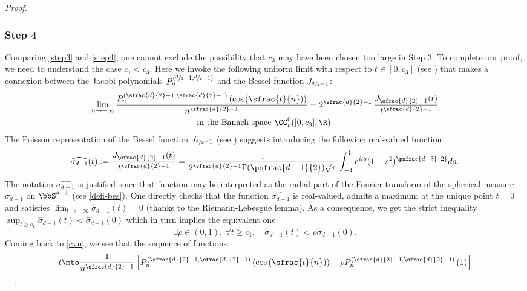 \begin{proof}
\subsubsection*{Step 4} Comparing \eqref{step3} and \eqref{step4}, one cannot exclude the possibility that $c_3$ may have been chosen too large in Step 3.
To complete our proof, we need to understand the case $c_1<c_3$.
Here we invoke the following uniform limit with respect to $t\in [0,c_3]$ (see \cite[p.\,192, (8.1.1)]{szeg}) that makes a connexion between the Jacobi polynomials $P_n^{(\sfrac{d}{2}-1,\sfrac{d}{2}-1)}$ and the Bessel function $J_{\sfrac{d}{2}-1}$:
\begin{multline}\label{cvu}
\lim_{n\to +\infty} \frac{P_n^{(\sfrac{d}{2}-1,\sfrac{d}{2}-1)}\left(\cos\left(\sfrac{t}{n}\right) \right)}{n^{\sfrac{d}{2}-1}}=2^{\sfrac{d}{2}-1}\, \frac{J_{\sfrac{d}{2}-1}(t)}{t^{\sfrac{d}{2}-1}}\\ \text{in the Banach space } \CC_t^0([0,c_3],\R).
\end{multline}
The Poisson representation of the Bessel function $J_{\sfrac{d}{2}-1}$ (see \cite[p.\,15, (1.71.6)]{szeg}) suggests introducing the following real-valued function
\begin{equation}\label{Poisson} \widehat{\sigma_{d-1}}(t):=\frac{J_{\sfrac{d}{2}-1}(t)}{t^{\sfrac{d}{2}-1}}=\frac{1}{2^{\sfrac{d}{2}-1}\Gamma(\psfrac{d-1}{2})\sqrt{\pi}}\int_{-1}^{1} e^{its} (1-s^2)^{\psfrac{d-3}{2}}ds.\end{equation}
The notation $\widehat{\sigma_{d-1}}$ is justified since that function may be interpreted as the radial part of the Fourier transform of the spherical measure $\sigma_{d-1}$ on $\bbS^{d-1}$ (see \eqref{defi-bes}).
One directly checks that the function $\widehat{\sigma_{d-1}}$ is real-valued, admits a maximum at the unique point $t=0$ and satisfies $\lim_{t\to +\infty}\widehat{\sigma}_{d-1}(t)=0$ (thanks to the Riemann-Lebesgue lemma).
As a consequence, we get the strict inequality $\sup_{t\geq c_1} \widehat{\sigma}_{d-1}(t)<\widehat{\sigma}_{d-1}(0)$ which in turn implies the equivalent one
\begin{equation}\label{bess}
\exists \rho\in (0,1),\ \forall t\geq c_1,\quad \widehat{\sigma}_{d-1}(t) < \rho \widehat{\sigma}_{d-1}(0).
\end{equation}
Coming back to \eqref{cvu}, we see that the sequence of functions
\begin{equation*}
t\mto \frac{1}{n^{\sfrac{d}{2}-1}}\left[P_n^{(\sfrac{d}{2}-1,\sfrac{d}{2}-1)}\left(\cos\left(\sfrac{t}{n}\right) \right)-\rho
P_n^{(\sfrac{d}{2}-1,\sfrac{d}{2}-1)}\left(1 \right)\right]

\end{equation*}
\end{proof}
